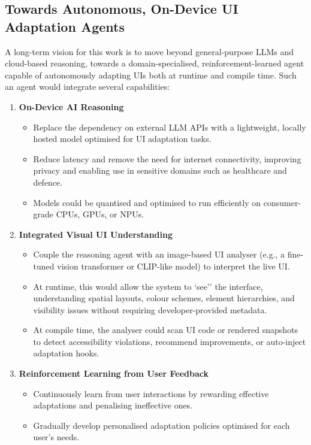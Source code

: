\documentclass[openany]{book}
\begin{document}
\subsection{Towards Autonomous, On-Device UI Adaptation Agents}
A long-term vision for this work is to move beyond general-purpose LLMs and cloud-based reasoning, towards a domain-specialised, reinforcement-learned agent capable of autonomously adapting UIs both at runtime and compile time.
Such an agent would integrate several capabilities:
\begin{enumerate}
    \item \textbf{On-Device AI Reasoning}
        \begin{itemize}
            \item Replace the dependency on external LLM APIs with a lightweight, locally hosted model optimised for UI adaptation tasks.
            \item Reduce latency and remove the need for internet connectivity, improving privacy and enabling use in sensitive domains such as healthcare and defence.
            \item Models could be quantised and optimised to run efficiently on consumer-grade CPUs, GPUs, or NPUs.
        \end{itemize}
    \item \textbf{Integrated Visual UI Understanding}
        \begin{itemize}
            \item Couple the reasoning agent with an image-based UI analyser (e.g., a fine-tuned vision transformer or CLIP-like model) to interpret the live UI.
            \item At runtime, this would allow the system to `see'' the interface, understanding spatial layouts, colour schemes, element hierarchies, and visibility issues without requiring developer-provided metadata.
            \item At compile time, the analyser could scan UI code or rendered snapshots to detect accessibility violations, recommend improvements, or auto-inject adaptation hooks.
        \end{itemize}
    \item \textbf{Reinforcement Learning from User Feedback}
        \begin{itemize}
            \item Continuously learn from user interactions by rewarding effective adaptations and penalising ineffective ones.
            \item Gradually develop personalised adaptation policies optimised for each user's needs.

\end{itemize}
\end{enumerate}
\end{document}
